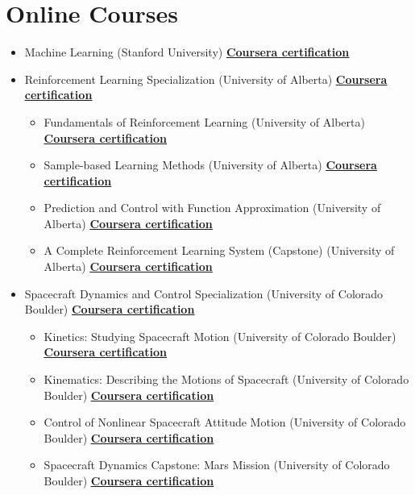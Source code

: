 \documentclass[10pt,a4paper,times]{moderncv}
\begin{document}
\section{Online Courses}
	\begin{itemize}
		\item Machine Learning (Stanford University)  \textbf{\href{https://coursera.org/verify/BCTCN2JXRGRD} {\underline{Coursera certification}}}	%
		\item Reinforcement Learning Specialization (University of Alberta)  \textbf{\href{https://coursera.org/verify/specialization/DHSXE3N9K4FL} {\underline{Coursera certification}}}%
		\begin{itemize}
		\item Fundamentals of Reinforcement Learning (University of Alberta)  \textbf{\href{https://coursera.org/verify/9BYJ37J7UPAY} {\underline{Coursera certification}}}%
		\item Sample-based Learning Methods (University of Alberta)  \textbf{\href{https://coursera.org/verify/CWRNZTCFMHWH} {\underline{Coursera certification}}}%
		\item Prediction and Control with Function Approximation (University of Alberta)  \textbf{\href{https://coursera.org/verify/JRM3TQND7S3E} {\underline{Coursera certification}}}%
		\item A Complete Reinforcement Learning System (Capstone) (University of Alberta)  \textbf{\href{https://coursera.org/verify/6Y8KGFC7RMDF} {\underline{Coursera certification}}}%
		\end{itemize}
		\item Spacecraft Dynamics and Control Specialization (University of Colorado Boulder)  \textbf{\href{https://coursera.org/verify/specialization/JUZXB4A8MCKZ} {\underline{Coursera certification}}}%
		\begin{itemize}
		\item Kinetics: Studying Spacecraft Motion (University of Colorado Boulder)  \textbf{\href{https://coursera.org/verify/E9RVRNYBTUFB} {\underline{Coursera certification}}}%
		\item Kinematics: Describing the Motions of Spacecraft (University of Colorado Boulder)  \textbf{\href{https://coursera.org/verify/G53HFNRJ9JBL} {\underline{Coursera certification}}}%
		\item Control of Nonlinear Spacecraft Attitude Motion (University of Colorado Boulder)  \textbf{\href{https://coursera.org/verify/B4XDEQFM6ZDY} {\underline{Coursera certification}}}%
		\item Spacecraft Dynamics Capstone: Mars Mission (University of Colorado Boulder)  \textbf{\href{https://coursera.org/verif y/DDJTUCGB66BG} {\underline{Coursera certification}}}%
		\end{itemize}
	\end{itemize}
\end{document}
